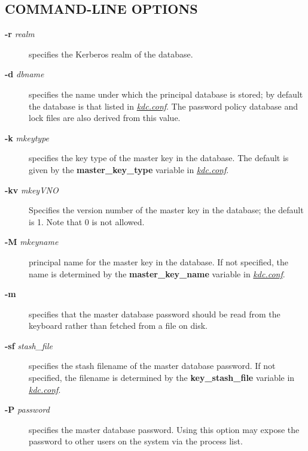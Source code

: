 \documentclass[letterpaper,10pt,english]{sphinxmanual}
\begin{document}
\subsection{COMMAND-LINE OPTIONS}
\label{admin/admin_commands/kdb5_util:command-line-options}\label{admin/admin_commands/kdb5_util:kdb5-util-options}\begin{description}
\item[{\textbf{-r} \emph{realm}}] \leavevmode
specifies the Kerberos realm of the database.

\item[{\textbf{-d} \emph{dbname}}] \leavevmode
specifies the name under which the principal database is stored;
by default the database is that listed in {\hyperref[admin/conf_files/kdc_conf:kdc-conf-5]{\emph{kdc.conf}}}.  The
password policy database and lock files are also derived from this
value.

\item[{\textbf{-k} \emph{mkeytype}}] \leavevmode
specifies the key type of the master key in the database.  The
default is given by the \textbf{master\_key\_type} variable in
{\hyperref[admin/conf_files/kdc_conf:kdc-conf-5]{\emph{kdc.conf}}}.

\item[{\textbf{-kv} \emph{mkeyVNO}}] \leavevmode
Specifies the version number of the master key in the database;
the default is 1.  Note that 0 is not allowed.

\item[{\textbf{-M} \emph{mkeyname}}] \leavevmode
principal name for the master key in the database.  If not
specified, the name is determined by the \textbf{master\_key\_name}
variable in {\hyperref[admin/conf_files/kdc_conf:kdc-conf-5]{\emph{kdc.conf}}}.

\item[{\textbf{-m}}] \leavevmode
specifies that the master database password should be read from
the keyboard rather than fetched from a file on disk.

\item[{\textbf{-sf} \emph{stash\_file}}] \leavevmode
specifies the stash filename of the master database password.  If
not specified, the filename is determined by the
\textbf{key\_stash\_file} variable in {\hyperref[admin/conf_files/kdc_conf:kdc-conf-5]{\emph{kdc.conf}}}.

\item[{\textbf{-P} \emph{password}}] \leavevmode
specifies the master database password.  Using this option may
expose the password to other users on the system via the process
list.

\end{description}
\end{document}
